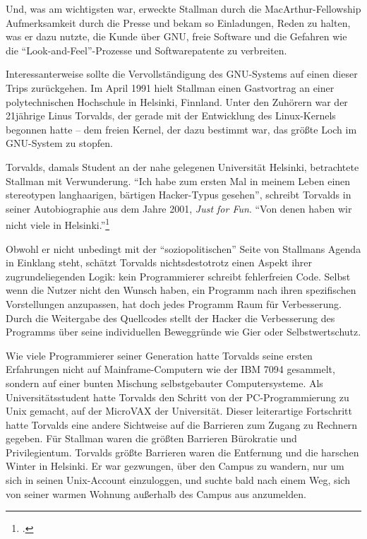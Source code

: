 Und, was am wichtigsten war, erweckte Stallman durch die MacArthur-Fellowship Aufmerksamkeit durch die Presse und bekam so Einladungen, Reden zu halten, was er dazu nutzte, die Kunde über GNU, freie Software und die Gefahren wie die "`Look-and-Feel"'-Prozesse und Softwarepatente zu verbreiten.

Interessanterweise sollte die Vervollständigung des GNU-Systems auf einen dieser Trips zurückgehen. Im April 1991 hielt Stallman einen Gastvortrag an einer polytechnischen Hochschule in Helsinki, Finnland. Unter den Zuhörern war der 21jährige Linus Torvalds, der gerade mit der Entwicklung des Linux-Kernels begonnen hatte – dem freien Kernel, der dazu bestimmt war, das größte Loch im GNU-System zu stopfen.

Torvalds, damals Student an der nahe gelegenen Universität Helsinki, betrachtete Stallman mit Verwunderung. "`Ich habe zum ersten Mal in meinem Leben einen stereotypen langhaarigen, bärtigen Hacker-Typus gesehen"', schreibt Torvalds in seiner Autobiographie aus dem Jahre 2001, \textit{Just for Fun}. "`Von denen haben wir nicht viele in Helsinki."'\footnote{\cite[Vgl.][S.\,58--59]{tojff}.\footnotemark}

Obwohl er nicht unbedingt mit der "`soziopolitischen"' Seite von Stallmans Agenda in Einklang steht, schätzt Torvalds nichtsdestotrotz einen Aspekt ihrer zugrundeliegenden Logik: kein Programmierer schreibt fehlerfreien Code. Selbst wenn die Nutzer nicht den Wunsch haben, ein Programm nach ihren spezifischen Vorstellungen anzupassen, hat doch jedes Programm Raum für Verbesserung. Durch die Weitergabe des Quellcodes stellt der Hacker die Verbesserung des Programms über seine individuellen Beweggründe wie Gier oder Selbstwertschutz.

Wie viele Programmierer seiner Generation hatte Torvalds seine ersten Erfahrungen nicht auf Mainframe-Computern wie der IBM 7094 gesammelt, sondern auf einer bunten Mischung selbstgebauter Computersysteme. Als Universitätsstudent hatte Torvalds den Schritt von der PC-Programmierung zu Unix gemacht, auf der MicroVAX der Universität. Dieser leiterartige Fortschritt hatte Torvalds eine andere Sichtweise auf die Barrieren zum Zugang zu Rechnern gegeben. Für Stallman waren die größten Barrieren Bürokratie und Privilegientum. Torvalds größte Barrieren waren die Entfernung und die harschen Winter in Helsinki. Er war gezwungen, über den Campus zu wandern, nur um sich in seinen Unix-Account einzuloggen, und suchte bald nach einem Weg, sich von seiner warmen Wohnung außerhalb des Campus aus anzumelden.

